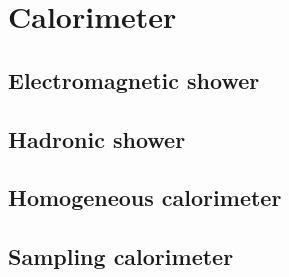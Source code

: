 \chapter{Calorimeter}

\section{Electromagnetic shower}

\section{Hadronic shower}

\section{Homogeneous calorimeter}

\section{Sampling calorimeter}
